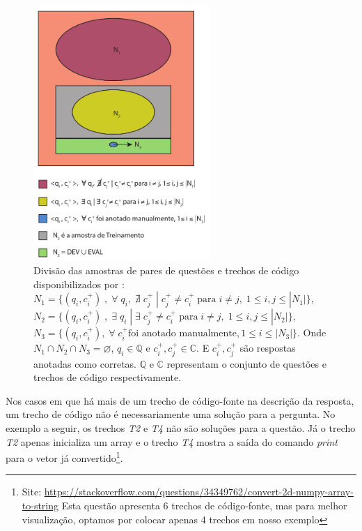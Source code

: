 \begin{figure}[h]
\centering
\includegraphics[width=0.6\textwidth]{figuras/cap-experimento/distinct-subsets-yao-sample.pdf}
\caption{Divisão das amostras de pares de questões e trechos de código disponibilizados por \cite{yao-2018}: $N_{1} = \{(q_{i}, c_{i}^{+})\;,\; \forall\; q_{i},\;\nexists\; c_{j}^{+}\; |\; c_{j}^{+} \neq c_{i}^{+}\; \text{para}\; i \neq j,\; 1 \leq i,j \leq |N_{1}| \}$, $N_{2} = \{(q_{i}, c_{i}^{+})\;,\; \exists\; q_{i}\; | \;\exists\; c_{j}^{+} \neq c_{i}^{+}\; \text{para} \; i \neq j,\; 1 \leq i,j \leq |N_{2}| \}$, $N_{3} = \{(q_{i}, c_{i}^{+}),\; \forall\; c_{i}^{+} \text{foi anotado manualmente}, 1 \leq i \leq |N_{3}| \}$. Onde $N_{1} \cap N_{2} \cap N_{3} = \varnothing$, $q_{i} \in \mathbb{Q}$ e $c_{i}^{+},  c_{j}^{+} \in \mathbb{C}$. E $c_{i}^{+}, c_{j}^{+}$ são respostas anotadas como corretas. $\mathbb{Q}$ e $\mathbb{C}$ representam o conjunto de questões e trechos de código respectivamente.} 
\label{fig:distinct-subset-python-pair-question-code}
\end{figure}

Nos casos em que há mais de um trecho de código-fonte na descrição da resposta, um trecho de código não é necessariamente uma solução para a pergunta. No exemplo a seguir, os trechos \emph{T2} e \emph{T4} não são soluções para a questão. Já o trecho \emph{T2} apenas inicializa um array e o trecho \emph{T4} mostra a saída do comando \textit{print} para o vetor já convertido\footnote{Site: \url{https://stackoverflow.com/questions/34349762/convert-2d-numpy-array-to-string} Esta questão apresenta 6 trechos de código-fonte, mas para melhor visualização, optamos por colocar apenas 4 trechos em nosso exemplo\label{foot:exemplo-stackoverflow-mais-de-um-trecho}}.



